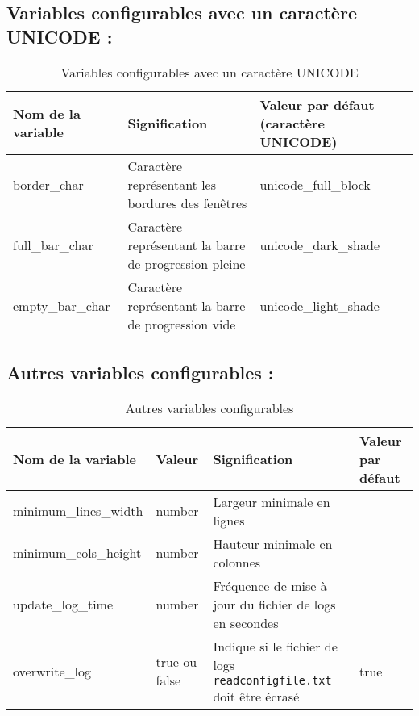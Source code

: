 \documentclass{article}
\begin{document}
\newpage
\subsection{Variables configurables avec un caractère UNICODE :}
\begin{table}[h!]
    \centering
    \renewcommand{\arraystretch}{1.5}
    \footnotesize
    \begin{tabular}{|>{\centering\arraybackslash}m{3cm}|>{\centering\arraybackslash}m{3cm}|>{\centering\arraybackslash}m{3cm}|}
        \hline
        \textbf{Nom de la variable} & \textbf{Signification} & \textbf{Valeur par défaut (caractère UNICODE)} \\
        \hline
        border\_char & Caractère représentant les bordures des fenêtres & unicode\_full\_block \\
        \hline
        full\_bar\_char & Caractère représentant la barre de progression pleine & unicode\_dark\_shade \\
        \hline
        empty\_bar\_char & Caractère représentant la barre de progression vide & unicode\_light\_shade \\
        \hline
    \end{tabular}
    \label{tab:configable_unicode_var}
    \caption{Variables configurables avec un caractère UNICODE}
\end{table}

\vspace{2em}
\subsection{Autres variables configurables :}
\begin{table}[h!]
    \centering
    \renewcommand{\arraystretch}{1.5}
    \footnotesize
    \begin{tabular}{|>{\centering\arraybackslash}m{3cm}|>{\centering\arraybackslash}m{1.6cm}|>{\centering\arraybackslash}m{3cm}|>{\centering\arraybackslash}m{1.6cm}|}
        \hline
        \textbf{Nom de la variable} & \textbf{Valeur} & \textbf{Signification} & \textbf{Valeur par défaut} \\
        \hline
        minimum\_lines\_width & number & Largeur minimale en lignes & 30 \\
        \hline
        minimum\_cols\_height & number & Hauteur minimale en colonnes & 70 \\
        \hline
        update\_log\_time & number & Fréquence de mise à jour du fichier de logs en secondes & 60 \\
        \hline
        overwrite\_log & true ou false & Indique si le fichier de logs \texttt{readconfigfile.txt} doit être écrasé & true \\
        \hline
    \end{tabular}
    \label{tab:configable_other_var}
    \caption{Autres variables configurables}
\end{table}
\end{document}
